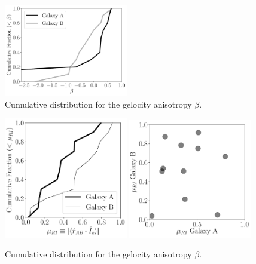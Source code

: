 \documentclass[a4paper,fleqn,usenatbib]{mnras}
\begin{document}
\begin{figure}
\centering
\includegraphics[width=0.48\textwidth]{beta.pdf}
\caption{
Cumulative distribution for the gelocity anisotropy $\beta$.
\label{fig:beta}}
\end{figure}


\begin{figure}
\centering
\includegraphics[width=0.48\textwidth]{mu_ri_cum.pdf}
\includegraphics[width=0.48\textwidth]{mu_ri_scatter.pdf}
\caption{
Cumulative distribution for the gelocity anisotropy $\beta$.
\label{fig:mu_ri}}
\end{figure}








\end{document}
